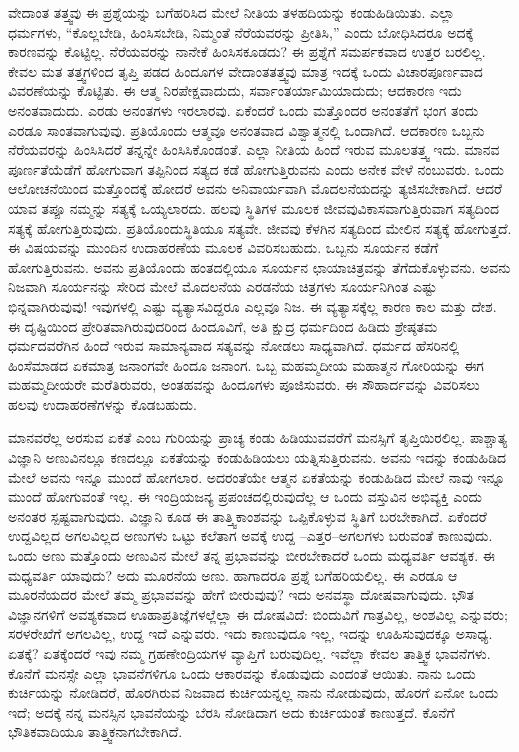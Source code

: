 ವೇದಾಂತ ತತ್ತ್ವವು ಈ ಪ್ರಶ್ನೆಯನ್ನು ಬಗೆಹರಿಸಿದ ಮೇಲೆ ನೀತಿಯ ತಳಹದಿಯನ್ನು ಕಂಡುಹಿಡಿಯಿತು. ಎಲ್ಲಾ ಧರ್ಮಗಳು, “ಕೊಲ್ಲಬೇಡಿ, ಹಿಂಸಿಸಬೇಡಿ, ನಿಮ್ಮಂತೆ ನೆರೆಯವರನ್ನು ಪ್ರೀತಿಸಿ,'' ಎಂದು ಬೋಧಿಸಿದರೂ ಅದಕ್ಕೆ ಕಾರಣವನ್ನು ಕೊಟ್ಟಿಲ್ಲ. ನೆರೆಯವರನ್ನು ನಾನೇಕೆ ಹಿಂಸಿಸಕೂಡದು? ಈ ಪ್ರಶ್ನೆಗೆ ಸಮರ್ಪಕವಾದ ಉತ್ತರ ಬರಲಿಲ್ಲ. ಕೇವಲ ಮತ ತತ್ತ್ವಗಳಿಂದ ತೃಪ್ತಿ ಪಡದ ಹಿಂದೂಗಳ ವೇದಾಂತತತ್ತ್ವವು ಮಾತ್ರ ಇದಕ್ಕೆ ಒಂದು ವಿಚಾರಪೂರ್ಣವಾದ ವಿವರಣೆಯನ್ನು ಕೊಟ್ಟಿತು. ಈ ಆತ್ಮ ನಿರಪೇಕ್ಷವಾದುದು, ಸರ್ವಾಂತರ್ಯಾಮಿಯಾದುದು; ಆದಕಾರಣ ಇದು ಅನಂತವಾದುದು. ಎರಡು ಅನಂತಗಳು ಇರಲಾರವು. ಏಕೆಂದರೆ ಒಂದು ಮತ್ತೊಂದರ ಅನಂತತೆಗೆ ಭಂಗ ತಂದು ಎರಡೂ ಸಾಂತವಾಗುವುವು. ಪ್ರತಿಯೊಂದು ಆತ್ಮವೂ ಅನಂತವಾದ ವಿಶ್ವಾತ್ಮನಲ್ಲಿ ಒಂದಾಗಿದೆ. ಆದಕಾರಣ ಒಬ್ಬನು ನೆರೆಯವರನ್ನು ಹಿಂಸಿಸಿದರೆ ತನ್ನನ್ನೇ ಹಿಂಸಿಸಿಕೊಂಡಂತೆ. ಎಲ್ಲಾ ನೀತಿಯ ಹಿಂದೆ ಇರುವ ಮೂಲತತ್ತ್ವ ಇದು. ಮಾನವ ಪೂರ್ಣತೆಯೆಡೆಗೆ ಹೋಗುವಾಗ ತಪ್ಪಿನಿಂದ ಸತ್ಯದ ಕಡೆ ಹೋಗುತ್ತಿರುವನು ಎಂದು ಅನೇಕ ವೇಳೆ ನಂಬುವರು. ಒಂದು ಆಲೋಚನೆಯಿಂದ ಮತ್ತೊಂದಕ್ಕೆ ಹೋದರೆ ಅವನು ಅನಿವಾರ್ಯವಾಗಿ ಮೊದಲನೆಯದನ್ನು ತ್ಯಜಿಸಬೇಕಾಗಿದೆ. ಆದರೆ ಯಾವ ತಪ್ಪೂ ನಮ್ಮನ್ನು ಸತ್ಯಕ್ಕೆ ಒಯ್ಯಲಾರದು. ಹಲವು ಸ್ಥಿತಿಗಳ ಮೂಲಕ ಜೀವವು\break ವಿಕಾಸವಾಗುತ್ತಿರುವಾಗ ಸತ್ಯದಿಂದ ಸತ್ಯಕ್ಕೆ ಹೋಗುತ್ತಿರುವುದು. ಪ್ರತಿಯೊಂದು\break ಸ್ಥಿತಿಯೂ ಸತ್ಯವೇ. ಜೀವವು ಕೆಳಗಿನ ಸತ್ಯದಿಂದ ಮೇಲಿನ ಸತ್ಯಕ್ಕೆ ಹೋಗುತ್ತದೆ. ಈ ವಿಷಯವನ್ನು ಮುಂದಿನ ಉದಾಹರಣೆಯ ಮೂಲಕ ವಿವರಿಸಬಹುದು. ಒಬ್ಬನು ಸೂರ್ಯನ ಕಡೆಗೆ ಹೋಗುತ್ತಿರುವನು. ಅವನು ಪ್ರತಿಯೊಂದು ಹಂತದಲ್ಲಿಯೂ ಸೂರ್ಯನ ಛಾಯಾಚಿತ್ರವನ್ನು ತೆಗೆದುಕೊಳ್ಳುವನು. ಅವನು ನಿಜವಾಗಿ ಸೂರ್ಯನನ್ನು ಸೇರಿದ ಮೇಲೆ ಮೊದಲನೆಯ ಎರಡನೆಯ ಚಿತ್ರಗಳು ಸೂರ್ಯನಿಗಿಂತ ಎಷ್ಟು ಭಿನ್ನವಾಗಿರುವುವು! ಇವುಗಳಲ್ಲಿ ಎಷ್ಟು ವ್ಯತ್ಯಾಸವಿದ್ದರೂ ಎಲ್ಲವೂ ನಿಜ. ಈ ವ್ಯತ್ಯಾಸಕ್ಕೆಲ್ಲ ಕಾರಣ ಕಾಲ ಮತ್ತು ದೇಶ. ಈ ದೃಷ್ಟಿಯಿಂದ ಪ್ರೇರಿತವಾಗಿರುವುದರಿಂದ ಹಿಂದೂವಿಗೆ, ಅತಿ ಕ್ಷುದ್ರ ಧರ್ಮದಿಂದ ಹಿಡಿದು ಶ್ರೇಷ್ಠತಮ ಧರ್ಮದವರೆಗಿನ ಹಿಂದೆ ಇರುವ ಸಾಮಾನ್ಯವಾದ ಸತ್ಯವನ್ನು ನೋಡಲು ಸಾಧ್ಯವಾಗಿದೆ. ಧರ್ಮದ ಹೆಸರಿನಲ್ಲಿ ಹಿಂಸೆಮಾಡದ ಏಕಮಾತ್ರ ಜನಾಂಗವೇ ಹಿಂದೂ ಜನಾಂಗ. ಒಬ್ಬ ಮಹಮ್ಮದೀಯ ಮಹಾತ್ಮನ ಗೋರಿಯನ್ನು ಈಗ ಮಹಮ್ಮದೀಯರೇ ಮರೆತಿರುವರು, ಅಂತಹವನ್ನು ಹಿಂದೂಗಳು ಪೂಜಿಸುವರು. ಈ ಸೌಹಾರ್ದವನ್ನು ವಿವರಿಸಲು ಹಲವು ಉದಾಹರಣೆಗಳನ್ನು ಕೊಡಬಹುದು.

ಮಾನವರೆಲ್ಲ ಅರಸುವ ಏಕತೆ ಎಂಬ ಗುರಿಯನ್ನು ಪ್ರಾಚ್ಯ ಕಂಡು ಹಿಡಿಯುವವರೆಗೆ ಮನಸ್ಸಿಗೆ ತೃಪ್ತಿಯಿರಲಿಲ್ಲ. ಪಾಶ್ಚಾತ್ಯ ವಿಜ್ಞಾನಿ ಅಣುವಿನಲ್ಲೂ ಕಣದಲ್ಲೂ ಏಕತೆಯನ್ನು ಕಂಡುಹಿಡಿಯಲು ಯತ್ನಿಸುತ್ತಿರುವನು. ಅವನು ಇದನ್ನು ಕಂಡುಹಿಡಿದ ಮೇಲೆ ಅವನು ಇನ್ನೂ ಮುಂದೆ ಹೋಗಲಾರ. ಅದರಂತೆಯೇ ಆತ್ಮನ ಏಕತೆಯನ್ನು ಕಂಡುಹಿಡಿದ ಮೇಲೆ ನಾವು ಇನ್ನೂ ಮುಂದೆ ಹೋಗುವಂತೆ ಇಲ್ಲ. ಈ ಇಂದ್ರಿಯಜನ್ಯ ಪ್ರಪಂಚದಲ್ಲಿರುವುದೆಲ್ಲ ಆ ಒಂದು ವಸ್ತುವಿನ ಅಭಿವ್ಯಕ್ತಿ ಎಂದು ಅನಂತರ ಸ್ಪಷ್ಟವಾಗುವುದು. ವಿಜ್ಞಾನಿ ಕೂಡ ಈ ತಾತ್ತ್ವಿಕಾಂಶವನ್ನು ಒಪ್ಪಿಕೊಳ್ಳುವ ಸ್ಥಿತಿಗೆ ಬರಬೇಕಾಗಿದೆ. ಏಕೆಂದರೆ ಉದ್ದವಿಲ್ಲದ ಅಗಲವಿಲ್ಲದ ಅಣುಗಳು ಒಟ್ಟು ಕಲೆತಾಗ ಅವಕ್ಕೆ ಉದ್ದ –ಎತ್ತರ–ಅಗಲಗಳು ಬರುವಂತೆ ಕಾಣುವುದು. ಒಂದು ಅಣು ಮತ್ತೊಂದು ಅಣುವಿನ ಮೇಲೆ ತನ್ನ ಪ್ರಭಾವವನ್ನು ಬೀರಬೇಕಾದರೆ ಒಂದು ಮಧ್ಯವರ್ತಿ ಆವಶ್ಯಕ. ಈ ಮಧ್ಯವರ್ತಿ ಯಾವುದು? ಅದು ಮೂರನೆಯ ಅಣು. ಹಾಗಾದರೂ ಪ್ರಶ್ನೆ ಬಗೆಹರಿಯಲಿಲ್ಲ. ಈ ಎರಡೂ ಆ ಮೂರನೆಯದರ ಮೇಲೆ ತಮ್ಮ ಪ್ರಭಾವವನ್ನು ಹೇಗೆ ಬೀರುವುವು? ಇದು ಅನವಸ್ಥಾ ದೋಷವಾಗುವುದು. ಭೌತ ವಿಜ್ಞಾನಗಳಿಗೆ ಅವಶ್ಯಕವಾದ ಊಹಾಪ್ರತಿಜ್ಞೆಗಳಲ್ಲೆಲ್ಲಾ ಈ ದೋಷವಿದೆ: ಬಿಂದುವಿಗೆ ಗಾತ್ರವಿಲ್ಲ, ಅಂಶವಿಲ್ಲ ಎನ್ನುವರು; ಸರಳರೇಖೆಗೆ ಅಗಲವಿಲ್ಲ, ಉದ್ದ ಇದೆ ಎನ್ನುವರು. ಇದು ಕಾಣುವುದೂ ಇಲ್ಲ, ಇದನ್ನು ಊಹಿಸುವುದಕ್ಕೂ ಅಸಾಧ್ಯ. ಏತಕ್ಕೆ? ಏತಕ್ಕೆಂದರೆ ಇವು ನಮ್ಮ ಗ್ರಹಣೇಂದ್ರಿಯಗಳ ವ್ಯಾಪ್ತಿಗೆ ಬರುವುದಿಲ್ಲ. ಇವೆಲ್ಲಾ ಕೇವಲ ತಾತ್ತ್ವಿಕ ಭಾವನೆಗಳು. ಕೊನೆಗೆ ಮನಸ್ಸೇ ಎಲ್ಲಾ ಭಾವನೆಗಳಿಗೂ ಒಂದು ಆಕಾರವನ್ನು ಕೊಡುವುದು ಎಂದಂತೆ ಆಯಿತು. ನಾನು ಒಂದು ಕುರ್ಚಿಯನ್ನು ನೋಡಿದರೆ, ಹೊರಗಿರುವ ನಿಜವಾದ ಕುರ್ಚಿಯನ್ನಲ್ಲ ನಾನು ನೋಡುವುದು, ಹೊರಗೆ ಏನೋ ಒಂದು ಇದೆ; ಅದಕ್ಕೆ ನನ್ನ ಮನಸ್ಸಿನ ಭಾವನೆಯನ್ನು ಬೆರಸಿ ನೋಡಿದಾಗ ಅದು ಕುರ್ಚಿಯಂತೆ ಕಾಣುತ್ತದೆ. ಕೊನೆಗೆ ಭೌತಿಕವಾದಿಯೂ ತಾತ್ತ್ವಿಕನಾಗಬೇಕಾಗಿದೆ.


